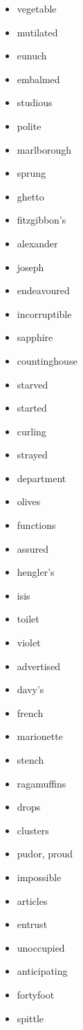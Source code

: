 \documentclass{article}
\begin{document}
\begin{itemize}
    \item vegetable
    \item mutilated
    \item eunuch
    \item embalmed
    \item studious
    \item polite
    \item marlborough
    \item sprung
    \item ghetto
    \item fitzgibbon's
    \item alexander
    \item joseph
    \item endeavoured
    \item incorruptible
    \item sapphire
    \item countinghouse
    \item starved
    \item started
    \item curling
    \item strayed
    \item department
    \item olives
    \item functions
    \item assured
    \item hengler's
    \item isis
    \item toilet
    \item violet
    \item advertised
    \item davy's
    \item french
    \item marionette
    \item stench
    \item ragamuffins
    \item drops
    \item clusters
    \item pudor, proud
    \item impossible
    \item articles
    \item entrust
    \item unoccupied
    \item anticipating
    \item fortyfoot
    \item spittle

\end{itemize}
\end{document}
